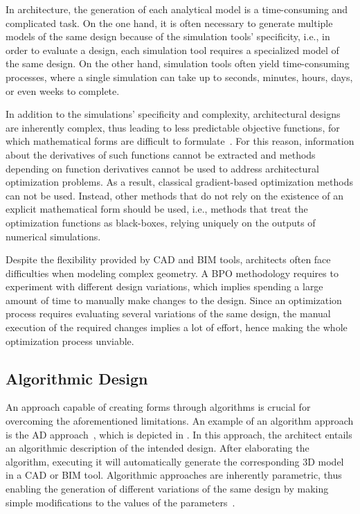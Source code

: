 	In architecture, the generation of each analytical model is a time-consuming and complicated task. On the one hand, it is often necessary to generate multiple models of the same design because of the simulation tools' specificity, i.e., in order to evaluate a design, each simulation tool requires a specialized model of the same design. On the other hand, simulation tools often yield time-consuming processes, where a single simulation can take up to seconds, minutes, hours, days, or even weeks to complete. 
	
	In addition to the simulations' specificity and complexity, architectural designs are inherently complex, thus leading to less predictable objective functions, for which mathematical forms are difficult to formulate~\cite{Machairas2014}. For this reason, information about the derivatives of such functions cannot be extracted and methods depending on function derivatives cannot be used to address architectural optimization problems. As a result, classical gradient-based optimization methods can not be used. Instead, other methods that do not rely on the existence of an explicit mathematical form should be used, i.e., methods that treat the optimization functions as black-boxes, relying uniquely on the outputs of numerical simulations.
	
	Despite the flexibility provided by \ac{CAD} and \ac{BIM} tools, architects often face difficulties when modeling complex geometry. A \ac{BPO} methodology requires to experiment with different design variations, which implies spending a large amount of time to manually make changes to the design. Since an optimization process requires evaluating several variations of the same design, the manual execution of the required changes implies a lot of effort, hence making the whole optimization process unviable.
	
\subsection{Algorithmic Design}

	An approach capable of creating forms through algorithms is crucial for overcoming the aforementioned limitations. An example of an algorithm approach is the \ac{AD} approach~\cite{Branco2017AD}, which is depicted in . In this approach, the architect entails an algorithmic description of the intended design. After elaborating the algorithm, executing it will automatically generate the corresponding 3D model in a \ac{CAD} or \ac{BIM} tool. Algorithmic approaches are inherently parametric, thus enabling the generation of different variations of the same design by making simple modifications to the values of the parameters~\cite{Leitao2014GD}. 
	
